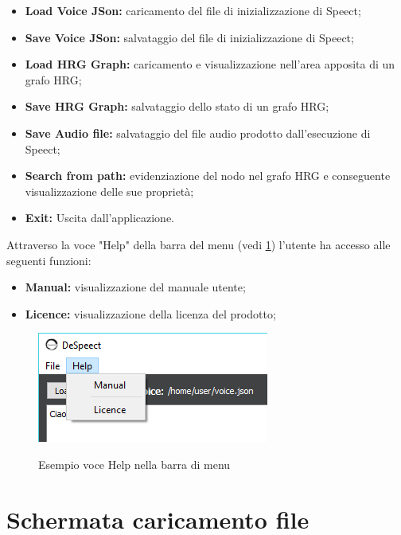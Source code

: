 \documentclass[../AnalisideiRequisiti.tex]{subfiles}
\begin{document}
		\begin{itemize}
			\item \textbf{Load Voice JSon:} caricamento del file di inizializzazione di Speect;
			\item \textbf{Save Voice JSon:} salvataggio del file di inizializzazione di Speect;
			\item \textbf{Load HRG Graph:} caricamento e visualizzazione nell'area apposita di un grafo HRG;
			\item \textbf{Save HRG Graph:} salvataggio dello stato di un grafo HRG;
			\item \textbf{Save Audio file:} salvataggio del file audio prodotto dall'esecuzione di Speect;
			\item \textbf{Search from path:} evidenziazione del nodo nel grafo HRG e conseguente visualizzazione delle sue proprietà;
			\item \textbf{Exit:} Uscita dall'applicazione.
		\end{itemize}
		 Attraverso la voce "Help" della barra del menu (vedi \ref{fig:menuhelp}) l'utente ha accesso alle seguenti funzioni:
		\begin{itemize}
			\item \textbf{Manual:} visualizzazione del manuale utente;
			\item \textbf{Licence:} visualizzazione della licenza del prodotto;
			
		\end{itemize}
	
		\begin{figure}[htp]
			\caption{Esempio voce Help nella barra di menu}
			\centering
			\includegraphics[]{../img/menu-help.png}
			\label{fig:menuhelp}
		\end{figure}
		
	\section{Schermata caricamento file}
	
\end{document}
